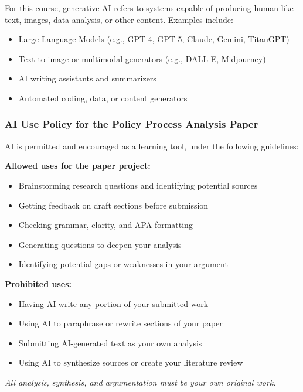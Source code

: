 \documentclass[12pt]{article}     %
\begin{document}
\noindent For this course, generative AI refers to systems capable of producing human-like text, images, data analysis, or other content. Examples include:

\begin{itemize}
    \item Large Language Models (e.g., GPT-4, GPT-5, Claude, Gemini, TitanGPT)
    \item Text-to-image or multimodal generators (e.g., DALL-E, Midjourney)
    \item AI writing assistants and summarizers
    \item Automated coding, data, or content generators
\end{itemize}

\subsubsection*{AI Use Policy for the Policy Process Analysis Paper}

AI is permitted and encouraged as a learning tool, under the following guidelines:

\textbf{Allowed uses for the paper project:}
\begin{itemize}
    \item Brainstorming research questions and identifying potential sources
    \item Getting feedback on draft sections before submission
    \item Checking grammar, clarity, and APA formatting
    \item Generating questions to deepen your analysis
    \item Identifying potential gaps or weaknesses in your argument
\end{itemize}

\textbf{Prohibited uses:}
\begin{itemize}
    \item Having AI write any portion of your submitted work
    \item Using AI to paraphrase or rewrite sections of your paper
    \item Submitting AI-generated text as your own analysis
    \item Using AI to synthesize sources or create your literature review
\end{itemize}

\textit{All analysis, synthesis, and argumentation must be your own original work.}
\end{document}
